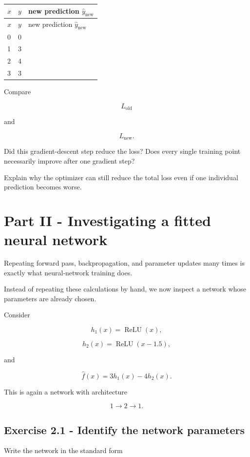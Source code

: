 \documentclass{course_sheet}
\begin{document}
\begingroup
\small
\setlength{\tabcolsep}{4pt}
\begin{longtable}{l|l|l}
$x$ & $y$ & new prediction $\hat y_{\mathrm{new}}$ \\[1.5pt]
\hline
\endfirsthead
$x$ & $y$ & new prediction $\hat y_{\mathrm{new}}$ \\[1.5pt]
\hline
\endhead
\rule{0pt}{2.4ex}0 & 0 &  $\phantom{-0.00}$ \\[3pt]
\rule{0pt}{2.4ex}1 & 3 &  $\phantom{-0.00}$ \\[3pt]
\rule{0pt}{2.4ex}2 & 4 &  $\phantom{-0.00}$ \\[3pt]
\rule{0pt}{2.4ex}3 & 3 &  $\phantom{-0.00}$ \\[3pt]
\end{longtable}
\endgroup
Compare

\[
L_{\mathrm{old}}
\]

and

\[
L_{\mathrm{new}}.
\]

Did this gradient-descent step reduce the loss? Does every single training point necessarily improve after one gradient step?

Explain why the optimizer can still reduce the total loss even if one individual prediction becomes worse.

\clearpage
\section*{Part II - Investigating a fitted neural network}
Repeating forward pass, backpropagation, and parameter updates many times is exactly what neural-network training does.

Instead of repeating these calculations by hand, we now inspect a network whose parameters are already chosen.

Consider

\[
h_1(x)=\operatorname{ReLU}(x),
\]

\[
h_2(x)=\operatorname{ReLU}(x-1.5),
\]

and

\[
\hat f(x)=3h_1(x)-4h_2(x).
\]

This is again a network with architecture

\[
1\rightarrow2\rightarrow1.
\]

\subsection*{Exercise 2.1 - Identify the network parameters}
Write the network in the standard form
\end{document}
